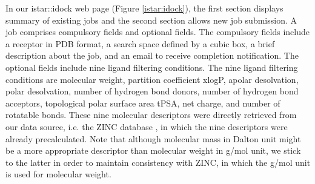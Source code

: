 In our istar::idock web page (Figure \ref{istar:idock}), the first section displays summary of existing jobs and the second section allows new job submission. A job comprises compulsory fields and optional fields. The compulsory fields include a receptor in PDB format, a search space defined by a cubic box, a brief description about the job, and an email to receive completion notification. The optional fields include nine ligand filtering conditions. The nine ligand filtering conditions are molecular weight, partition coefficient xlogP, apolar desolvation, polar desolvation, number of hydrogen bond donors, number of hydrogen bond acceptors, topological polar surface area tPSA, net charge, and number of rotatable bonds. These nine molecular descriptors were directly retrieved from our data source, i.e. the ZINC database \citep{532,1178}, in which the nine descriptors were already precalculated. Note that although molecular mass in Dalton unit might be a more appropriate descriptor than molecular weight in g/mol unit, we stick to the latter in order to maintain consistency with ZINC, in which the g/mol unit is used for molecular weight.

